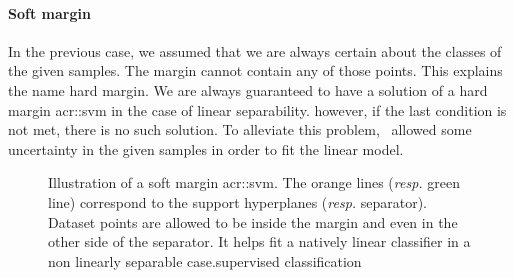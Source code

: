             \paragraph{Soft margin}
                In the previous case, we assumed that we are always certain about the classes of the given samples.
                The margin cannot contain any of those points.
                This explains the name hard margin.
                We are always guaranteed to have a solution of a hard margin \gls{acr::svm} in the case of linear separability.
                however, if the last condition is not met, there is no such solution.
                To alleviate this problem,~\textcite{cortes1995support} allowed some uncertainty in the given samples in order to fit the linear model.\\

                \begin{figure}
                    \centering
                    
                    \caption[
                        Illustration of a soft margin \acrshort*{acr::svm}.
                    ]{
                        \label{fig::soft_margin} Illustration of a soft margin \gls{acr::svm}.
                        The orange lines (\textit{resp.} green line) correspond to the support hyperplanes (\textit{resp.} separator).
                        Dataset points are allowed to be inside the margin and even in the other side of the separator.
                        It helps fit a natively linear classifier in a non linearly separable case.supervised classification
                    }
                \end{figure}

